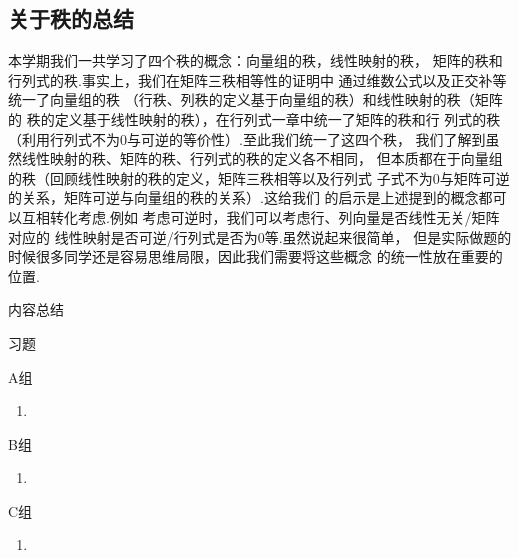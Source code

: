 \subsection{关于秩的总结}
本学期我们一共学习了四个秩的概念：向量组的秩，线性映射的秩，
矩阵的秩和行列式的秩.事实上，我们在矩阵三秩相等性的证明中
通过维数公式以及正交补等统一了向量组的秩
（行秩、列秩的定义基于向量组的秩）和线性映射的秩（矩阵的
秩的定义基于线性映射的秩），在行列式一章中统一了矩阵的秩和行
列式的秩（利用行列式不为0与可逆的等价性）.至此我们统一了这四个秩，
我们了解到虽然线性映射的秩、矩阵的秩、行列式的秩的定义各不相同，
但本质都在于向量组的秩（回顾线性映射的秩的定义，矩阵三秩相等以及行列式
子式不为0与矩阵可逆的关系，矩阵可逆与向量组的秩的关系）.这给我们
的启示是上述提到的概念都可以互相转化考虑.例如
考虑可逆时，我们可以考虑行、列向量是否线性无关/矩阵对应的
线性映射是否可逆/行列式是否为0等.虽然说起来很简单，
但是实际做题的时候很多同学还是容易思维局限，因此我们需要将这些概念
的统一性放在重要的位置.

\vspace{2ex} 
\centerline{\heiti \Large 内容总结}

\vspace{2ex} 

\centerline{\heiti \Large 习题}
\vspace{2ex} 
{\kaishu }
\begin{flushright}
    \kaishu

\end{flushright}
\centerline{\heiti A组}
\begin{enumerate}
	\item 
\end{enumerate}
\centerline{\heiti B组}
\begin{enumerate}
	\item 
\end{enumerate}
\centerline{\heiti C组}
\begin{enumerate}
	\item 
\end{enumerate}